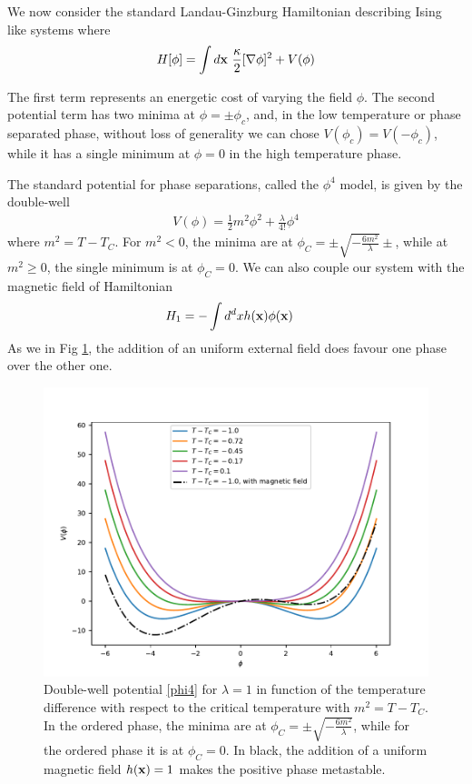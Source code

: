 We now consider the standard Landau-Ginzburg Hamiltonian \cite{landau_physique_1990} describing Ising like systems where
\begin{equation}
H[\phi] = \int d{\bf x} \ \frac{\kappa}{2}[\nabla \phi]^2 + V(\phi)
\label{landau-ginzburg-hamiltonian}
\end{equation}

The first term represents an energetic cost of varying the field $\phi$. The second potential term has two minima at $\phi=\pm \phi_c$, and, in the low temperature or phase separated phase, without loss of generality we can chose $V(\phi_c)=V(-\phi_c)$, while it has a single minimum at $\phi=0$ in the high temperature phase.

The standard potential for phase separations, called the $\phi^4$ model, is given by the double-well
\begin{align}
V(\phi) = \frac{1}{2} m^2 \phi^2 + \frac{\lambda}{4!} \phi^4
\label{phi4}
\end{align} 
where $m^2 = T-T_C$. For $m^2 \less 0$, the minima are at $\phi_C = \pm \sqrt{- \frac{6 m^2}{\lambda} } \pm$, while at $m^2 \ge 0$, the single minimum is at $\phi_C = 0$. We can also couple our system with the magnetic field of Hamiltonian
\begin{align}
H_1 &= - \int d^dx h({\bf x})\phi({\bf x})
\label{champ-externe}
\end{align}
As we in Fig \ref{double-puits-temperature}, the addition of an uniform external field does favour one phase over the other one.


\begin{figure}
\centering
\includegraphics[width=0.6\linewidth]{intro/double-puit-en-fonction-temp.pdf}
\caption{Double-well potential \eqref{phi4} for $\lambda=1$ in function of the temperature difference with respect to the critical temperature with $m^2 = T-T_C$. In the ordered phase, the minima are at $\phi_C =\pm \sqrt{- \frac{6 m^2}{\lambda} } $, while for the ordered phase it is at $\phi_C = 0$. In black, the addition of a uniform magnetic field $h({\bf x}) = 1$ makes the positive phase metastable.}
\label{double-puits-temperature}
\end{figure}

